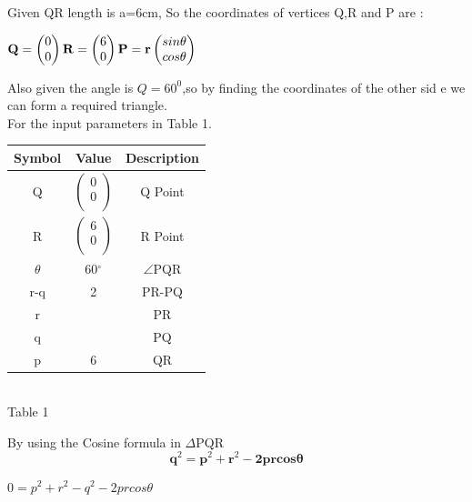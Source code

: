 \documentclass[10pt,a4paper]{article}
\let\vec\mathbf
\begin{document}
\begin{multicols}{2}
Given QR length is a=6cm,
So the coordinates of vertices  Q,R and P are :\vspace{2mm}\\
\begin{center}$
\vec{
 Q =\begin{pmatrix}
0 \\
0 
\end{pmatrix} 
\vspace{1mm}
R=\begin{pmatrix}
6 \\
0 
\end{pmatrix} 
\vspace{1mm}
P=r\begin{pmatrix}
sin \theta\\
  cos \theta\\
\end{pmatrix} }
\vspace{1mm}$
\end{center}
Also given the angle is $Q=60^0$,so by finding the coordinates of the other sid
    e we can form a required triangle. \\
 \vspace{2mm}
For the input parameters in Table 1.\\
{\setlength\extrarowheight{2pt}
\begin{center}
\begin{tabular}{|c|c|c|}
	\hline
	\textbf{Symbol}&\textbf{Value}&\textbf{Description}\\
	\hline
	Q&$\begin{pmatrix}
	0\\0\\
	\end{pmatrix} $& Q Point\\
	\hline
	R&$\begin{pmatrix}
	6\\0\\
	\end{pmatrix} $& R Point\\
	\hline
	$\theta$&60$^{\circ}$&$\angle$PQR\\
	\hline
	r-q & 2 & PR-PQ\\
	\hline
	r&  & PR\\
	\hline
	q &  & PQ\\
	\hline
	p & 6 & QR\\
	\hline
\end{tabular}
\\ {Table 1}\\
\end{center}
\vspace{3mm} 
By using the Cosine formula in  $\Delta$PQR \\ 
\begin{equation}
	\vec{q}^2=\vec{p}^2+\vec{r}^2-
\vec{2prcos\theta} 
\end{equation}
\begin{center}
	$0=p^2+r^2 -q^2-2prcos\theta$\\
\vspace{5mm}


\end{center}}
\end{multicols}
\end{document}
